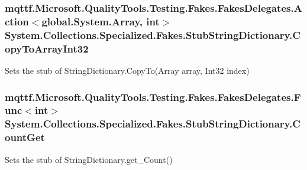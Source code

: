\hypertarget{class_system_1_1_collections_1_1_specialized_1_1_fakes_1_1_stub_string_dictionary_aefa450934cebcd11bf272666f74d0e78}{
\subsubsection[{Copy\-To\-Array\-Int32}]{\setlength{\rightskip}{0pt plus 5cm}mqttf.\-Microsoft.\-Quality\-Tools.\-Testing.\-Fakes.\-Fakes\-Delegates.\-Action$<$global.\-System.\-Array, int$>$ System.\-Collections.\-Specialized.\-Fakes.\-Stub\-String\-Dictionary.\-Copy\-To\-Array\-Int32}}\label{class_system_1_1_collections_1_1_specialized_1_1_fakes_1_1_stub_string_dictionary_aefa450934cebcd11bf272666f74d0e78}


Sets the stub of String\-Dictionary.\-Copy\-To(\-Array array, Int32 index)

\hypertarget{class_system_1_1_collections_1_1_specialized_1_1_fakes_1_1_stub_string_dictionary_a2de7d9c231ca4e728325b03475b4edb3}{
\subsubsection[{Count\-Get}]{\setlength{\rightskip}{0pt plus 5cm}mqttf.\-Microsoft.\-Quality\-Tools.\-Testing.\-Fakes.\-Fakes\-Delegates.\-Func$<$int$>$ System.\-Collections.\-Specialized.\-Fakes.\-Stub\-String\-Dictionary.\-Count\-Get}}\label{class_system_1_1_collections_1_1_specialized_1_1_fakes_1_1_stub_string_dictionary_a2de7d9c231ca4e728325b03475b4edb3}


Sets the stub of String\-Dictionary.\-get\-\_\-\-Count()

